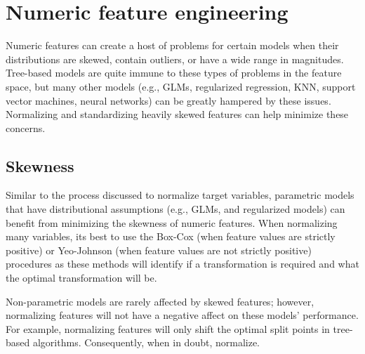 \documentclass[]{krantz}
\makeatletter
\newenvironment{Shaded}{\begin{snugshade}}{\end{snugshade}}
\newcommand{\CommentTok}[1]{\textcolor[rgb]{0.37,0.37,0.37}{\textit{#1}}}
\newcommand{\DataTypeTok}[1]{\textcolor[rgb]{0.27,0.27,0.27}{#1}}
\newcommand{\KeywordTok}[1]{\textcolor[rgb]{0.27,0.27,0.27}{\textbf{#1}}}
\newcommand{\NormalTok}[1]{#1}
\newcommand{\OperatorTok}[1]{\textcolor[rgb]{0.43,0.43,0.43}{\textbf{#1}}}
\newcommand{\StringTok}[1]{\textcolor[rgb]{0.5,0.5,0.5}{#1}}
\newenvironment{kframe}{%
\medskip{}
\setlength{\fboxsep}{.8em}
 \def\at@end@of@kframe{}%
 \ifinner\ifhmode%
  \def\at@end@of@kframe{\end{minipage}}%
  \begin{minipage}{\columnwidth}%
 \fi\fi%
 \def\FrameCommand##1{\hskip\@totalleftmargin \hskip-\fboxsep
 \colorbox{shadecolor}{##1}\hskip-\fboxsep
     \hskip-\linewidth \hskip-\@totalleftmargin \hskip\columnwidth}%
 \MakeFramed {\advance\hsize-\width
   \@totalleftmargin\z@ \linewidth\hsize
   \@setminipage}}%
 {\par\unskip\endMakeFramed%
 \at@end@of@kframe}
\newenvironment{block}[1]
  {
  \begin{itemize}
  \renewcommand{\labelitemi}{
    \raisebox{-.7\height}[0pt][0pt]{
      {\setkeys{Gin}{width=3em,keepaspectratio}\texttt{[image: icons/\#1]}}
    }
  }
  \setlength{\fboxsep}{1em}
  \begin{kframe}
  \item
  }
  {
  \end{kframe}
  \end{itemize}
  }
\newenvironment{note}
  {\begin{block}{note}}
  {\end{block}}
\renewenvironment{Shaded}{\begin{kframe}}{\end{kframe}}
\makeatother
\begin{document}
\hypertarget{numeric-feature-engineering}{%
\section{Numeric feature engineering}\label{numeric-feature-engineering}}

Numeric features can create a host of problems for certain models when their distributions are skewed, contain outliers, or have a wide range in magnitudes. Tree-based models are quite immune to these types of problems in the feature space, but many other models (e.g., GLMs, regularized regression, KNN, support vector machines, neural networks) can be greatly hampered by these issues. Normalizing and standardizing heavily skewed features can help minimize these concerns.

\hypertarget{skewness}{%
\subsection{Skewness}\label{skewness}}

Similar to the process discussed to normalize target variables, parametric models that have distributional assumptions (e.g., GLMs, and regularized models) can benefit from minimizing the skewness of numeric features. When normalizing many variables, its best to use the Box-Cox (when feature values are strictly positive) or Yeo-Johnson (when feature values are not strictly positive) procedures as these methods will identify if a transformation is required and what the optimal transformation will be.

\begin{note}
Non-parametric models are rarely affected by skewed features; however,
normalizing features will not have a negative affect on these models'
performance. For example, normalizing features will only shift the
optimal split points in tree-based algorithms. Consequently, when in
doubt, normalize.
\end{note}

\begin{Shaded}
\end{Shaded}
\end{document}
